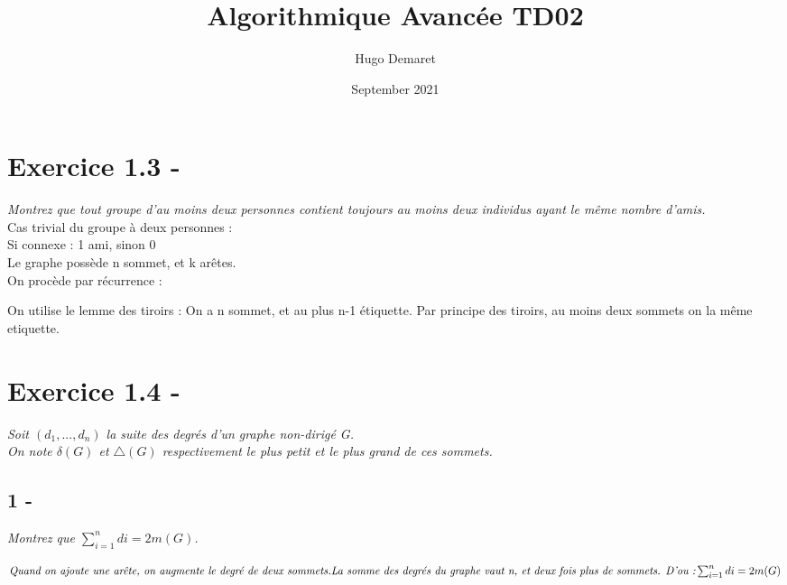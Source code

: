\documentclass{article}
\title{Algorithmique Avancée TD02}
\author{Hugo Demaret}
\date{September 2021}
\begin{document}
\maketitle
\section*{Exercice 1.3 -}
\textit{Montrez que tout groupe d'au moins deux personnes contient toujours au moins deux individus ayant le même nombre d'amis.}\\
\textsf{Cas trivial du groupe à deux personnes :}\\
\textsf{Si connexe : 1 ami, sinon 0}\\
\textsf{Le graphe possède n sommet, et k arêtes.}\\
\textsf{On procède par récurrence :}
    \begin{center}
            On utilise le lemme des tiroirs :
            \linebreak
            On a n sommet, et au plus n-1 étiquette.
            \linebreak
            Par principe des tiroirs, au moins deux sommets on la même etiquette.
    \end{center}
\section*{Exercice 1.4 -}
    \textit{Soit $(d_{1},...,d_{n})$ la suite des degrés d'un graphe non-dirigé G.}\\
    \textit{On note $\delta(G)$ et $\bigtriangleup(G)$ respectivement le plus petit et le plus grand de ces sommets.}\\
    \subsection*{1 -}
        \textit{Montrez que $\sum_{i=1}^{n} di = 2m(G) $.}
            \begin{center}
            $
            \textit{Quand on ajoute une arête, on augmente le degré de deux sommets.}
            \linebreak
            \textit{La somme des degrés du graphe vaut n, et deux fois plus de sommets. D'ou :}
            \linebreak
            \sum_{i=1}^{n} di = 2m(G) 
            $
            \end{center}
\end{document}
